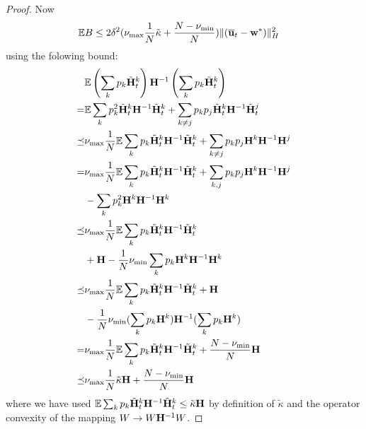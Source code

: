 \begin{proof}
	Now 
	\begin{align*}
	\mathbb{E}B & \leq2\delta^{2}(\nu_{\max}\frac{1}{N}\tilde{\kappa}+\frac{N-\nu_{\min}}{N})\|({\overline{\mathbf{u}}}_{t}-{\mathbf{w}}^{\ast})\|_{H}^{2}
	\end{align*}
	using the folowing bound: 
	\begin{align*}
	&\mathbb{E}\left(\sum_{k}p_{k}\tilde{{\mathbf{H}}}_{t}^{k}\right){\mathbf{H}}^{-1}\left(\sum_{k}p_{k}\tilde{{\mathbf{H}}}_{t}^{k}\right) \\
 =&\mathbb{E}\sum_{k}p_{k}^{2}\tilde{{\mathbf{H}}}_{t}^{k}{\mathbf{H}}^{-1}\tilde{{\mathbf{H}}}_{t}^{k}+\sum_{k\neq j}p_{k}p_{j}\tilde{{\mathbf{H}}}_{t}^{k}{\mathbf{H}}^{-1}\tilde{{\mathbf{H}}}_{t}^{j}\\
\preceq &\nu_{\max}\frac{1}{N}\mathbb{E}\sum_{k}p_{k}\tilde{{\mathbf{H}}}_{t}^{k}{\mathbf{H}}^{-1}\tilde{{\mathbf{H}}}_{t}^{k}+\sum_{k\neq j}p_{k}p_{j}{\mathbf{H}}^{k}{\mathbf{H}}^{-1}{\mathbf{H}}^{j}\\
=&\nu_{\max}\frac{1}{N}\mathbb{E}\sum_{k}p_{k}\tilde{{\mathbf{H}}}_{t}^{k}{\mathbf{H}}^{-1}\tilde{{\mathbf{H}}}_{t}^{k}+\sum_{k,j}p_{k}p_{j}{\mathbf{H}}^{k}{\mathbf{H}}^{-1}{\mathbf{H}}^{j}\\
&-\sum_{k}p_{k}^{2}{\mathbf{H}}^{k}{\mathbf{H}}^{-1}{\mathbf{H}}^{k}\\
	\preceq &\nu_{\max}\frac{1}{N}\mathbb{E}\sum_{k}p_{k}\tilde{{\mathbf{H}}}_{t}^{k}{\mathbf{H}}^{-1}\tilde{{\mathbf{H}}}_{t}^{k}\\
	&+{\mathbf{H}}-\frac{1}{N}\nu_{\min}\sum_{k}p_{k}{\mathbf{H}}^{k}{\mathbf{H}}^{-1}{\mathbf{H}}^{k}\\
	\preceq &\nu_{\max}\frac{1}{N}\mathbb{E}\sum_{k}p_{k}\tilde{{\mathbf{H}}}_{t}^{k}{\mathbf{H}}^{-1}\tilde{{\mathbf{H}}}_{t}^{k}+{\mathbf{H}}\\
	&-\frac{1}{N}\nu_{\min}(\sum_{k}p_{k}{\mathbf{H}}^{k}){\mathbf{H}}^{-1}(\sum_{k}p_{k}{\mathbf{H}}^{k})\\
	=&\nu_{\max}\frac{1}{N}\mathbb{E}\sum_{k}p_{k}\tilde{{\mathbf{H}}}_{t}^{k}{\mathbf{H}}^{-1}\tilde{{\mathbf{H}}}_{t}^{k}+\frac{N-\nu_{\min}}{N}{\mathbf{H}}\\
	\preceq &\nu_{\max}\frac{1}{N}\tilde{\kappa}{\mathbf{H}}+\frac{N-\nu_{\min}}{N}{\mathbf{H}}
	\end{align*}
	where we have used $\mathbb{E}\sum_{k}p_{k}\tilde{{\mathbf{H}}}_{t}^{k}{\mathbf{H}}^{-1}\tilde{{\mathbf{H}}}_{t}^{k}\leq\tilde{\kappa}{\mathbf{H}}$
	by definition of $\tilde{\kappa}$ and the operator convexity of the
	mapping $W\rightarrow W{\mathbf{H}}^{-1}W$.
	

\end{proof}
